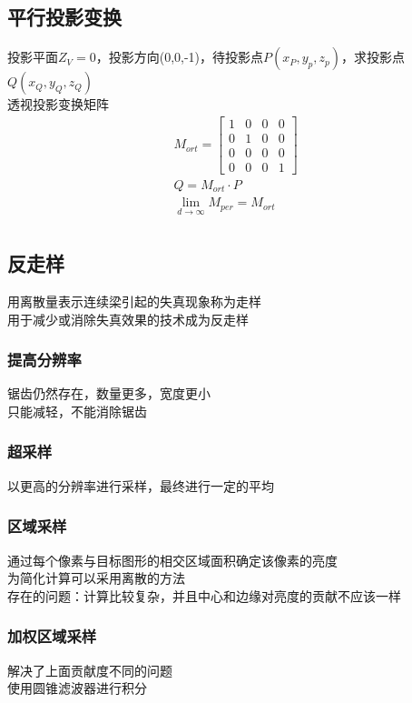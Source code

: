 \documentclass{article}
\begin{document}
\begin{CJK}{UTF8}{gbsn}
	\subsection{平行投影变换}
	投影平面$Z_V=0$，投影方向(0,0,-1)，待投影点$P(x_P,y_p,z_p)$，求投影点$Q(x_Q,y_Q,z_Q)$\\
	透视投影变换矩阵\\
	\begin{equation*}
	\begin{split}	
	M_{ort}=\begin{bmatrix}
	1&0&0&0\\
	0&1&0&0\\
	0&0&0&0\\
	0&0&0&1
	\end{bmatrix}\\
	Q=M_{ort}\cdot P\\
	\lim\limits_{d\rightarrow \infty}M_{per}=M_{ort}\\
	\end{split}
	\end{equation*}
	\subsection{反走样}
	用离散量表示连续梁引起的失真现象称为走样\\
	用于减少或消除失真效果的技术成为反走样\\
	\subsubsection{提高分辨率}
	锯齿仍然存在，数量更多，宽度更小\\
	只能减轻，不能消除锯齿\\
	\subsubsection{超采样}
	以更高的分辨率进行采样，最终进行一定的平均\\
	\subsubsection{区域采样}
	通过每个像素与目标图形的相交区域面积确定该像素的亮度\\
	为简化计算可以采用离散的方法\\
	存在的问题：计算比较复杂，并且中心和边缘对亮度的贡献不应该一样\\
	\subsubsection{加权区域采样}
	解决了上面贡献度不同的问题\\
	使用圆锥滤波器进行积分\\

\end{CJK}
\end{document}
